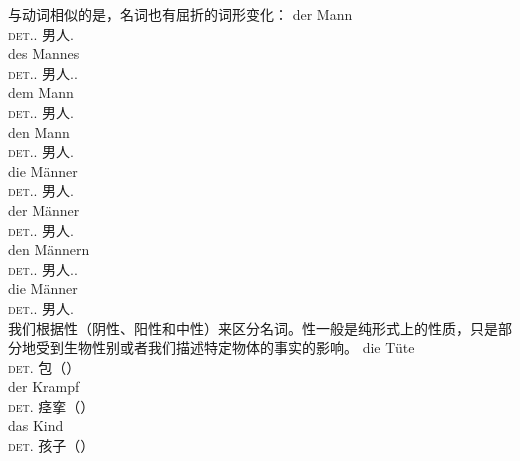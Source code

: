 与动词相似的是，名词也有屈折的词形变化：
\eal
\ex 
\gll der                 Mann\\
     \textsc{det}.\nom.\sg{} 男人.\sg\\
\ex 
\gll des                 Mannes\\
     \textsc{det}.\gen.\sg{} 男人.\gen.\sg\\
\ex 
\gll dem                 Mann\\
     \textsc{det}.\dat.\sg{} 男人.\sg\\
\ex 
\gll den                 Mann\\
     \textsc{det}.\acc.\sg{} 男人.\sg\\
\ex 
\gll die                     Männer\\
     \textsc{det}.\nom.\pl{} 男人.\pl\\
\ex 
\gll der                     Männer\\
     \textsc{det}.\gen.\pl{} 男人.\pl\\
\ex 
\gll den                     Männern\\
     \textsc{det}.\dat.\pl{} 男人.\dat.\pl\\
\ex 
\gll die                     Männer\\
     \textsc{det}.\acc.\pl{} 男人.\pl\\
\zl
我们根据性（阴性、阳性和中性）来区分名词。性一般是纯形式上的性质，只是部分地受到生物性别或者我们描述特定物体的事实的影响。
\eal
\ex
\gll die Tüte\\
	 \textsc{det}.\fem{} 包（\fem）\\
\ex 
\gll der Krampf\\
	 \textsc{det}.\mas{} 痉挛（\mas）\\
\ex 
\gll das Kind\\
	 \textsc{det}.\neu{} 孩子（\neu）\\
\zl

